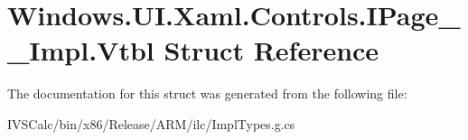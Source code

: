 \hypertarget{struct_windows_1_1_u_i_1_1_xaml_1_1_controls_1_1_i_page_____impl_1_1_vtbl}{}\section{Windows.\+U\+I.\+Xaml.\+Controls.\+I\+Page\+\_\+\+\_\+\+Impl.\+Vtbl Struct Reference}
\label{struct_windows_1_1_u_i_1_1_xaml_1_1_controls_1_1_i_page_____impl_1_1_vtbl}


The documentation for this struct was generated from the following file\+:\begin{DoxyCompactItemize}
\item 
I\+V\+S\+Calc/bin/x86/\+Release/\+A\+R\+M/ilc/Impl\+Types.\+g.\+cs\end{DoxyCompactItemize}
